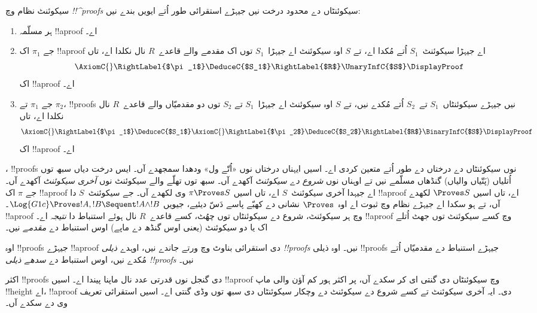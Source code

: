 \documentclass[../../../include/open-logic-section]{subfiles}
\begin{document}
\begin{defn}
سیکوئنٹ نظام وچ \emph{!!^{proof}s} سیکوئنٹاں دے محدود درخت نیں جیہڑے استقرائی طور اُتے ایویں بندے نیں:
\begin{enumerate}
  \item{} ہر مسلّمہ !!a{proof} اے۔
  \item{} جے $\pi_1$ اک !!a{proof} اے جیہڑا سیکوئنٹ~$S_1$ اُتے مُکدا اے، تے $S$ اوہ سیکوئنٹ اے جیہڑا~$S_1$ توں اک مقدمے والے قاعدے~$R$ نال نکلدا اے، تاں
  \[
  \AxiomC{}
  \RightLabel{$\pi_1$}
  \DeduceC{$S_1$}
  \RightLabel{$R$}
  \UnaryInfC{$S$}
  \DisplayProof
  \]
  اک !!a{proof} اے۔
  \item{} جے $\pi_1$ تے $\pi_2$، !!{proof}s نیں جیہڑے سیکوئنٹاں~$S_1$ تے~$S_2$ اُتے مُکدے نیں، تے $S$ اوہ سیکوئنٹ اے جیہڑا~$S_1$ تے $S_2$ توں دو مقدمیّاں والے قاعدے~$R$ نال نکلدا اے، تاں
  \[
  \AxiomC{}
  \RightLabel{$\pi_1$}
  \DeduceC{$S_1$}
  \AxiomC{}
  \RightLabel{$\pi_2$}
  \DeduceC{$S_2$}
  \RightLabel{$R$}
  \BinaryInfC{$S$}
  \DisplayProof
  \]
  اک !!a{proof} اے۔
\end{enumerate}
\end{defn}

، !!{proof}s نوں سیکوئنٹاں دے درختاں دے طور اُتے متعین کردی اے۔ اسیں ایہناں درختاں نوں «اُتّے ول» ودھدا سمجھدے آں۔ ایس درخت دیاں سبھ توں اُتلیاں (پَتّیاں والیاں) گنڈھاں مسلّمے نیں تے اوہناں نوں \emph{شروع دے سیکوئنٹ} آکھدے آں۔ سبھ توں تھلّے والے سیکوئنٹ نوں \emph{آخری سیکوئنٹ} آکھدے آں۔ جے $\pi$ اک !!a{proof} اے جیہدا آخری سیکوئنٹ~$S$ اے، تاں اسیں $\pi \Proves S$ وی لکھدے آں۔ جے سیکوئنٹ~$S$ دا !!a{proof} اے، تاں اسیں $\Proves S$ لکھدے آں، تے ہو سکدا اے جیہڑے نظام وچ ثبوت اے اوہ~$\Proves$ نشانی دے کھبّے پاسے دَسّ دیئیے، جیویں $\Log{G1c} \Proves !A, !B \Sequent !A \land
!B$۔ !!a{proof} وچ ہر سیکوئنٹ، شروع دے سیکوئنٹاں توں چھُٹ، کسے قاعدے~$R$ نال ہوئے استنباط دا \emph{نتیجہ} اے۔ !!a{proof} وچ کسے سیکوئنٹ توں جھٹ اُتلے اک یا دو سیکوئنٹ (یعنی اوس گنڈھ دے ماپے) اوس استنباط دے \emph{مقدمے} نیں۔

اوہ !!{proof}s جیہڑے !!a{proof} دی استقرائی بناوٹ وچ ورتے جاندے نیں، اوہدے \emph{ذیلی !!{proof}s} نیں۔ اوہ ذیلی !!{proof}s جیہڑے استنباط دے مقدمیّاں اُتے مُکدے نیں، اوس استنباط دے \emph{سدھے ذیلی !!{proof}s} نیں۔

اکثر !!{proof}s دی گنجل نوں قدرتی عدد نال ماپنا پیندا اے۔ اسیں !!a{proof} وچ سیکوئنٹاں دی گنتی ای کر سکدے آں، پر اکثر ہور کم آؤن والی ماپ !!{height} اے، !!a{proof} دی۔ ایہ آخری سیکوئنٹ تے کسے شروع دے سیکوئنٹ دے وچکار سیکوئنٹاں دی سبھ توں وڈی گنتی اے۔ اسیں استقرائی تعریف وی دے سکدے آں۔
\end{document}
